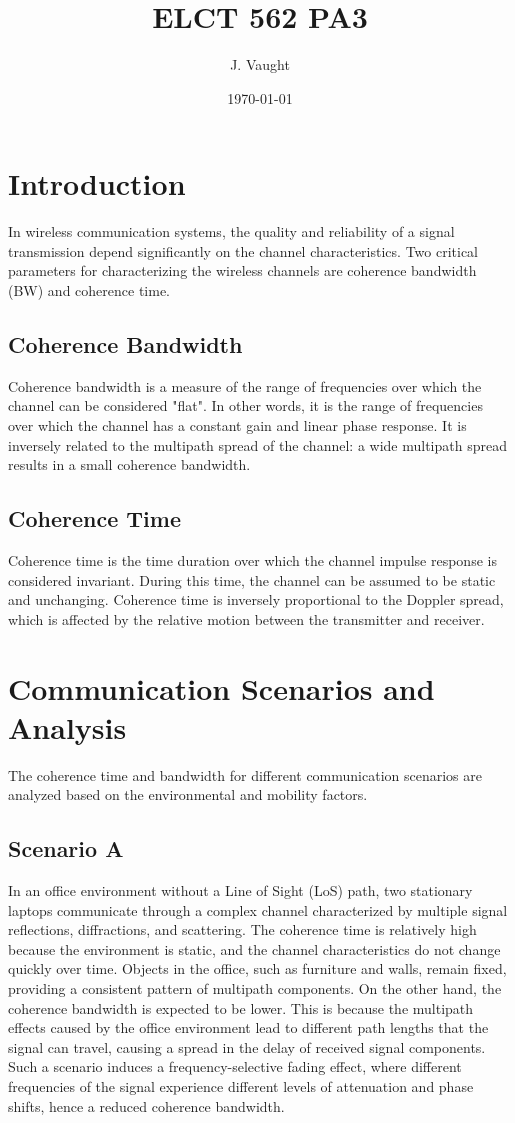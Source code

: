 \documentclass[12pt]{article}
\title{ELCT 562 PA3}
\author{J. Vaught}
\date{\today}
\begin{document}
\maketitle

\section{Introduction}
In wireless communication systems, the quality and reliability of a signal transmission depend significantly on the channel characteristics. Two critical parameters for characterizing the wireless channels are coherence bandwidth (BW) and coherence time.

\subsection{Coherence Bandwidth}
Coherence bandwidth is a measure of the range of frequencies over which the channel can be considered "flat". In other words, it is the range of frequencies over which the channel has a constant gain and linear phase response. It is inversely related to the multipath spread of the channel: a wide multipath spread results in a small coherence bandwidth.

\subsection{Coherence Time}
Coherence time is the time duration over which the channel impulse response is considered invariant. During this time, the channel can be assumed to be static and unchanging. Coherence time is inversely proportional to the Doppler spread, which is affected by the relative motion between the transmitter and receiver.
\newpage
\section{Communication Scenarios and Analysis}
The coherence time and bandwidth for different communication scenarios are analyzed based on the environmental and mobility factors.

\subsection{Scenario A}
In an office environment without a Line of Sight (LoS) path, two stationary laptops communicate through a complex channel characterized by multiple signal reflections, diffractions, and scattering. The coherence time is relatively high because the environment is static, and the channel characteristics do not change quickly over time. Objects in the office, such as furniture and walls, remain fixed, providing a consistent pattern of multipath components. On the other hand, the coherence bandwidth is expected to be lower. This is because the multipath effects caused by the office environment lead to different path lengths that the signal can travel, causing a spread in the delay of received signal components. Such a scenario induces a frequency-selective fading effect, where different frequencies of the signal experience different levels of attenuation and phase shifts, hence a reduced coherence bandwidth.
\end{document}
